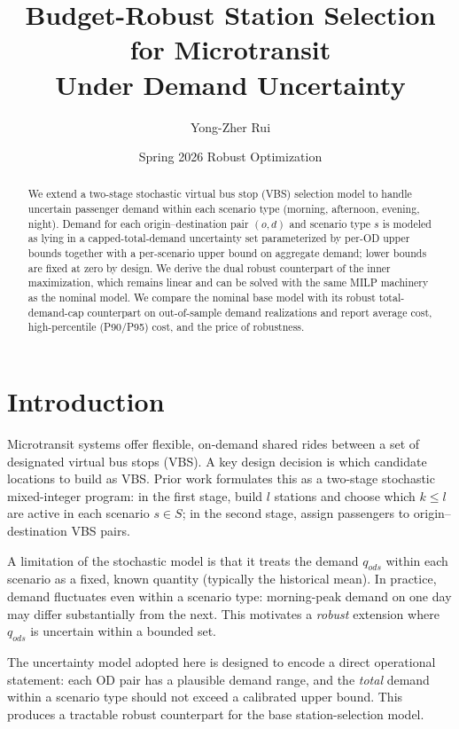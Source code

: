 \documentclass[11pt]{article}
\title{%
  Budget-Robust Station Selection for Microtransit\\
  Under Demand Uncertainty%
}
\author{Yong-Zher Rui}
\date{Spring 2026 \quad 15.094 Robust Optimization}
\theoremstyle{definition}
\begin{document}
\maketitle

\begin{abstract}
	We extend a two-stage stochastic virtual bus stop (VBS) selection model to
	handle uncertain passenger demand within each scenario type (morning,
	afternoon, evening, night).  Demand for each origin--destination pair
	$(o,d)$ and scenario type $s$ is modeled as lying in a capped-total-demand
	uncertainty set parameterized by per-OD upper bounds together with a
	per-scenario upper bound on aggregate demand; lower bounds are fixed at zero
	by design.  We derive the dual robust counterpart of the inner maximization,
	which remains linear and can be solved with the same MILP machinery as the
	nominal model.  We compare the nominal base model with its robust
	total-demand-cap counterpart on out-of-sample demand realizations and report
	average cost, high-percentile (P90/P95) cost, and the price of robustness.
\end{abstract}

\tableofcontents
\bigskip

\section{Introduction}
\label{sec:intro}

Microtransit systems offer flexible, on-demand shared rides between a set of
designated virtual bus stops (VBS).  A key design decision is which candidate
locations to build as VBS.  Prior work formulates this as a two-stage stochastic
mixed-integer program: in the first stage, build $l$ stations and choose which
$k \le l$ are active in each scenario $s \in S$; in the second stage, assign
passengers to origin--destination VBS pairs.

A limitation of the stochastic model is that it treats the demand $q_{ods}$
within each scenario as a fixed, known quantity (typically the historical mean).
In practice, demand fluctuates even within a scenario type: morning-peak demand
on one day may differ substantially from the next.  This motivates a
\emph{robust} extension where $q_{ods}$ is uncertain within a bounded set.

The uncertainty model adopted here is designed to encode a direct operational
statement: each OD pair has a plausible demand range, and the \emph{total}
demand within a scenario type should not exceed a calibrated upper bound.  This
produces a tractable robust counterpart for the base station-selection model.
\end{document}
